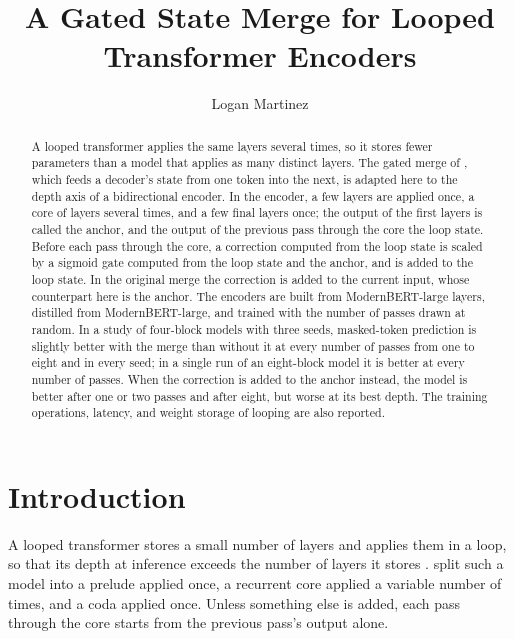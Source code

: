 \documentclass[11pt]{article}
\title{A Gated State Merge for Looped Transformer Encoders}
\author{Logan Martinez}
\date{}
\begin{document}
\maketitle

\begin{abstract}
A looped transformer applies the same layers several times, so it stores fewer parameters than a model that applies as many distinct
layers. The gated merge of \citet{zhang2026rlt}, which feeds a decoder's state from one token into the next, is adapted here to the depth
axis of a bidirectional encoder. In the encoder, a few layers are applied once, a core of layers several times, and a few final layers once; the
output of the first layers is called the anchor, and the output of the previous pass through the core the loop state. Before each pass through
the core, a correction computed from the loop state is scaled by a sigmoid gate computed from the loop state and the anchor, and is added to the
loop state. In the original merge the correction is added to the current input, whose counterpart here is the anchor. The encoders are built from ModernBERT-large layers, distilled from ModernBERT-large, and trained with the
number of passes drawn at random. In a study of four-block models with three seeds, masked-token prediction is slightly better with the merge than
without it at every number of passes from one to eight and in every seed; in a single run of an eight-block model it is better at every number of
passes. When the correction is added to the anchor instead, the model is better after one or two passes and after eight, but worse at its best
depth. The training operations, latency, and weight storage of looping are also reported.
\end{abstract}

\section{Introduction}

A looped transformer stores a small number of layers and applies them in a loop, so that its depth at inference exceeds the number of layers it
stores \citep{dehghani2019universal,lan2020albert,dabre2019recurrent,takase2021lessons}. \citet{geiping2025recurrent} split such a model into a
prelude applied once, a recurrent core applied a variable number of times, and a coda applied once. Unless something else is added, each pass
through the core starts from the previous pass's output alone.
\end{document}
